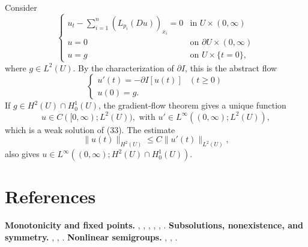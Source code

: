 \begin{example}
\label{ex:quasilinear-parabolic-gradient-flow}
Consider
\[
\begin{cases}
u_t - \sum_{i=1}^n (L_{p_i}(Du))_{x_i} = 0 & \text{in } U \times (0, \infty) \\
u = 0 & \text{on } \partial U \times (0, \infty) \\
u = g & \text{on } U \times \{t = 0\},
\end{cases}
\tag{33}
\]
where $g \in L^2(U)$. By the characterization of $\partial I$, this is the abstract flow
\[
\begin{cases} u'(t) = -\partial I[u(t)] & (t \geq 0) \\ u(0) = g. \end{cases}
\tag{34}
\]
If $g \in H^2(U) \cap H^1_0(U)$, the gradient-flow theorem gives a unique function
\[
u \in C([0,\infty); L^2(U)), \text{ with } u' \in L^\infty((0,\infty); L^2(U)),
\]
which is a weak solution of (33). The estimate
\[
\|u(t)\|_{H^2(U)} \leq C\|u'(t)\|_{L^2(U)},
\]
also gives $u \in L^\infty((0,\infty); H^2(U) \cap H^1_0(U))$.
\end{example}

\section{References}
\label{sec:references-ch9}
\textbf{Monotonicity and fixed points.} \cite{Lions1969}, \cite{Zeidler1985}, \cite{Evans1990}, \cite{Zeidler1985}, \cite{GilbargTrudinger1983}, \cite{GilbargTrudinger1983}.
\textbf{Subsolutions, nonexistence, and symmetry.} \cite{Smoller1983}, \cite{Payne1975}, \cite{GidasNiNirenberg1979}.
\textbf{Nonlinear semigroups.} \cite{Brezis1973}, \cite{Barbu1976}, \cite{Zeidler1985}.
